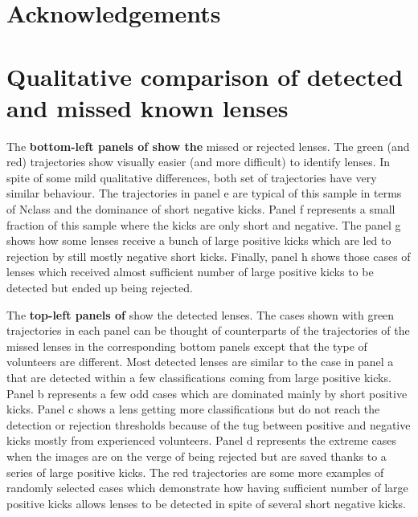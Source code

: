 \documentclass[useAMS,usenatbib,a4paper]{mn2e}
\begin{document}
\twocolumn
\section*{Acknowledgements}





\appendix

\section{Qualitative comparison of detected and missed known lenses}
\label{appendix:traj}

The {\bf bottom-left panels of  show the} missed or rejected lenses. The green (and red)
trajectories show visually easier (and more difficult) to identify
lenses. In spite of some mild qualitative differences, both set of
trajectories have very similar behaviour. The trajectories in panel e
are typical of this sample in terms of Nclass and the dominance of short
negative kicks. Panel f represents a small fraction of this sample
where the kicks are only short and negative. The panel g shows how some
lenses receive a bunch of large positive kicks which are led to
rejection by still mostly negative short kicks. Finally, panel h shows
those cases of lenses which received almost sufficient number of large
positive kicks to be detected but ended up being rejected.

The {\bf top-left panels of } show the detected lenses. The cases shown with green trajectories
in each panel can be thought of counterparts of the trajectories of the
missed lenses in the corresponding bottom panels except that the type of
volunteers are different. Most detected lenses are similar to the case
in panel a that are detected within a few classifications coming from
large positive kicks.  Panel b represents a few odd cases which are
dominated mainly by short positive kicks. Panel c shows a lens getting
more classifications but do not reach the detection or rejection
thresholds because of the tug between positive and negative kicks mostly
from experienced volunteers.  Panel d represents the extreme cases when
the images are on the verge of being rejected but are saved thanks to a
series of large positive kicks.  The red trajectories are some more
examples of randomly selected cases which demonstrate how having
sufficient number of large positive kicks allows lenses to be detected
in spite of several short negative kicks.
\end{document}
